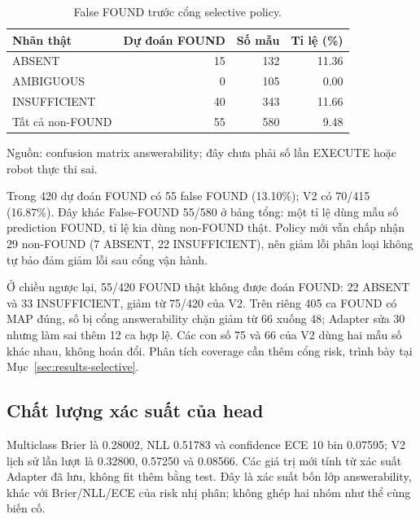 \begin{table}[htbp]
    \centering
    \setlength{\tabcolsep}{4pt}
    \renewcommand{\arraystretch}{1.15}
    \caption{False FOUND trước cổng selective policy.}
    \label{tab:results-false-found}
    \small
    \begin{tabularx}{\textwidth}{@{}>{\raggedright\arraybackslash}Xrrr@{}}
        \toprule
        Nhãn thật & Dự đoán FOUND & Số mẫu & Tỉ lệ (\%) \\
        \midrule
        ABSENT & 15 & 132 & 11.36 \\
        AMBIGUOUS & 0 & 105 & 0.00 \\
        INSUFFICIENT & 40 & 343 & 11.66 \\
        \midrule
        Tất cả non-FOUND & 55 & 580 & 9.48 \\
        \bottomrule

    \end{tabularx}
    \vspace{2pt}
    {\footnotesize\raggedright Nguồn: confusion matrix answerability;
    đây chưa phải số lần EXECUTE hoặc robot thực thi sai.\par}
\end{table}

Trong 420 dự đoán FOUND có 55 false FOUND (13.10\%);
V2 có 70/415 (16.87\%). Đây khác False-FOUND 55/580 ở bảng tổng:
một tỉ lệ dùng mẫu số prediction FOUND, tỉ lệ kia dùng non-FOUND thật.
Policy mới vẫn chấp nhận 29 non-FOUND (7 ABSENT, 22 INSUFFICIENT),
nên giảm lỗi phân loại không tự bảo đảm giảm lỗi sau cổng vận hành.

Ở chiều ngược lại, 55/420 FOUND thật không được đoán FOUND:
22 ABSENT và 33 INSUFFICIENT, giảm từ 75/420 của V2.
Trên riêng 405 ca FOUND có MAP đúng, số bị cổng answerability chặn
giảm từ 66 xuống 48; Adapter sửa 30 nhưng làm sai thêm 12 ca hợp lệ.
Các con số 75 và 66 của V2 dùng hai mẫu số khác nhau, không hoán đổi.
Phân tích coverage cần thêm cổng risk, trình bày tại
Mục~\ref{sec:results-selective}.

\subsection{Chất lượng xác suất của head}

Multiclass Brier là 0.28002, NLL 0.51783 và confidence ECE 10 bin 0.07595; V2 lịch sử lần lượt là 0.32800, 0.57250 và 0.08566. Các giá trị mới tính từ xác suất Adapter đã lưu, không fit thêm bằng test. Đây là xác suất
bốn lớp answerability, khác với Brier/NLL/ECE
của risk nhị phân; không ghép hai nhóm như thể
cùng biến cố.


